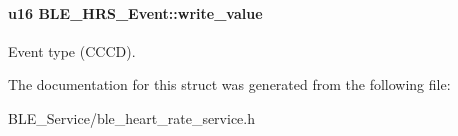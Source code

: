 \paragraph[{\texorpdfstring{write\+\_\+value}{write_value}}]{\setlength{\rightskip}{0pt plus 5cm}u16 B\+L\+E\+\_\+\+H\+R\+S\+\_\+\+Event\+::write\+\_\+value}\hypertarget{struct_b_l_e___h_r_s___event_ac02debd342b4423ac228f32d66a91f3a}{}\label{struct_b_l_e___h_r_s___event_ac02debd342b4423ac228f32d66a91f3a}
Event type (C\+C\+CD). 

The documentation for this struct was generated from the following file\+:\begin{DoxyCompactItemize}
\item 
B\+L\+E\+\_\+\+Service/ble\+\_\+heart\+\_\+rate\+\_\+service.\+h\end{DoxyCompactItemize}
